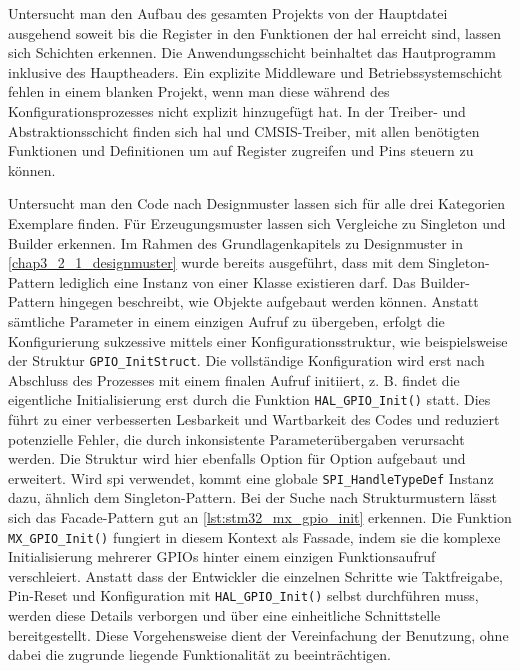 Untersucht man den Aufbau des gesamten Projekts von der Hauptdatei ausgehend soweit bis die Register in den Funktionen der \gls{hal} erreicht sind, lassen sich Schichten erkennen.
Die Anwendungsschicht beinhaltet das Hautprogramm inklusive des Hauptheaders.
Ein explizite Middleware und Betriebssystemschicht fehlen in einem blanken Projekt, wenn man diese während des Konfigurationsprozesses nicht explizit hinzugefügt hat.
In der Treiber- und Abstraktionsschicht finden sich \gls{hal} und CMSIS-Treiber, mit allen benötigten Funktionen und Definitionen um auf Register zugreifen und Pins steuern zu können. 

Untersucht man den Code nach Designmuster lassen sich für alle drei Kategorien Exemplare finden.
Für Erzeugungsmuster lassen sich Vergleiche zu Singleton und Builder erkennen.
Im Rahmen des Grundlagenkapitels zu Designmuster in \cref{chap3_2_1_designmuster} wurde bereits  ausgeführt, dass mit dem Singleton-Pattern lediglich eine Instanz von einer Klasse existieren darf.
Das Builder-Pattern hingegen beschreibt, wie Objekte aufgebaut werden können.
Anstatt sämtliche Parameter in einem einzigen Aufruf zu übergeben, erfolgt die Konfigurierung sukzessive mittels einer Konfigurationsstruktur, wie beispielsweise der Struktur \texttt{GPIO\_InitStruct}. 
Die vollständige Konfiguration wird erst nach Abschluss des Prozesses mit einem finalen Aufruf initiiert, z. B. findet die eigentliche Initialisierung erst durch die Funktion \texttt{HAL\_GPIO\_Init()} statt. 
Dies führt zu einer verbesserten Lesbarkeit und Wartbarkeit des Codes und reduziert potenzielle Fehler, die durch inkonsistente Parameterübergaben verursacht werden.
Die Struktur wird hier ebenfalls Option für Option aufgebaut und erweitert.
Wird \gls{spi} verwendet, kommt eine globale \texttt{SPI\_HandleTypeDef} Instanz dazu, ähnlich dem Singleton-Pattern.
Bei der Suche nach Strukturmustern lässt sich das Facade-Pattern gut an \cref{lst:stm32_mx_gpio_init} erkennen.
Die Funktion \texttt{MX\_GPIO\_Init()} fungiert in diesem Kontext als Fassade, indem sie die komplexe Initialisierung mehrerer GPIOs hinter einem einzigen Funktionsaufruf verschleiert.
Anstatt dass der Entwickler die einzelnen Schritte wie Taktfreigabe, Pin-Reset und Konfiguration mit \texttt{HAL\_GPIO\_Init()} selbst durchführen muss, werden diese Details verborgen und über eine einheitliche Schnittstelle bereitgestellt. 
Diese Vorgehensweise dient der Vereinfachung der Benutzung, ohne dabei die zugrunde liegende Funktionalität zu beeinträchtigen.

